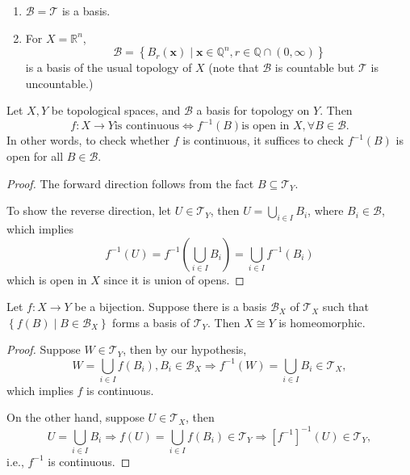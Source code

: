 \begin{example} 
\leavevmode
\begin{enumerate}
    \item \(\mathcal{B} = \mathcal{T}\) is a basis.
\item For \(X = {\mathbb{R}}^{n}\),
\[
\mathcal{B} = \left\{  {{B}_{r}\left(\mathbf{x}\right)  \mid  \mathbf{x} \in  {\mathbb{Q}}^{n},r \in  \mathbb{Q}\cap \left({0,\infty}\right)}\right\}
\]
is a basis of the usual topology of $X$ (note that \(\mathcal{B}\) is countable but $\mathcal{T}$ is uncountable.)
\end{enumerate}
\end{example}




\begin{proposition} Let \(X,Y\) be topological spaces, and \(\mathcal{B}\) a basis for topology on \(Y\). Then
\[
f : X \rightarrow  Y\text{is continuous} \Leftrightarrow  {f}^{-1}\left(B\right) \text{is open in }X,\forall B \in  \mathcal{B}.
\]
In other words, to check whether $f$ is continuous, it suffices to check \({f}^{-1}\left(B\right)\) is open for all \(B \in  \mathcal{B}\).
\end{proposition}

\begin{proof} The forward direction follows from the fact \(B \subseteq  {\mathcal{T}}_Y\).

To show the reverse direction, let \(U \in  {\mathcal{T}}_Y\), then \(U = \mathop{\bigcup}\limits_{{i \in  I}}{B}_{i}\), where \({B}_{i} \in  \mathcal{B}\), which implies
\[
{f}^{-1}\left(U\right)  = {f}^{-1}\left({\mathop{\bigcup}\limits_{{i \in  I}}{B}_{i}}\right)  = \mathop{\bigcup}\limits_{{i \in  I}}{f}^{-1}\left({B}_{i}\right)
\]
which is open in \(X\) since it is union of opens.
\end{proof}

\begin{corollary} \label{cor:basis_homeo} Let \(f : X \rightarrow  Y\) be a bijection. Suppose there is a basis \({\mathcal{B}}_X\) of \({\mathcal{T}}_X\) such that \(\left\{  {f\left(B\right)  \mid  B \in  {\mathcal{B}}_X}\right\}\) forms a basis of \({\mathcal{T}}_Y\). Then \(X \cong  Y\) is homeomorphic.
\end{corollary}

\begin{proof} Suppose \(W \in  {\mathcal{T}}_Y\), then by our hypothesis,
\[
W = \mathop{\bigcup}\limits_{{i \in  I}}f\left({B}_{i}\right),{B}_{i} \in  {\mathcal{B}}_X \Rightarrow  {f}^{-1}\left(W\right)  = \mathop{\bigcup}\limits_{{i \in  I}}{B}_{i} \in  {\mathcal{T}}_X,
\]
which implies \(f\) is continuous.

On the other hand, suppose \(U \in  {\mathcal{T}}_X\), then
\[
U = \mathop{\bigcup}\limits_{{i \in  I}}{B}_{i} \Rightarrow  f\left(U\right)  = \mathop{\bigcup}\limits_{{i \in  I}}f\left({B}_{i}\right)  \in  {\mathcal{T}}_Y \Rightarrow  {\left\lbrack  {f}^{-1}\right\rbrack }^{-1}\left(U\right)  \in  {\mathcal{T}}_Y,
\]
i.e., \({f}^{-1}\) is continuous.
\end{proof}


